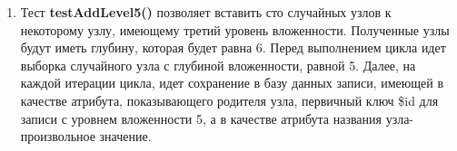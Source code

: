 \documentclass[a4paper,14pt]{extreport}
\theoremstyle{definition}
\begin{document}
\begin{enumerate}
\begin{table}[H]
\end{table}
\item Тест \textbf{testAddLevel5()} позволяет вставить сто случайных узлов к некоторому узлу, имеющему третий уровень вложенности. Полученные узлы будут иметь глубину, которая будет равна 6. Перед выполнением цикла идет выборка случайного узла с глубиной вложенности, равной 5. Далее, на каждой итерации цикла, идет сохранение в базу данных записи, имеющей в качестве атрибута, показывающего родителя узла, первичный ключ \$id для записи с уровнем вложенности 5, а в качестве атрибута названия узла-произвольное значение.


\end{enumerate}
\end{document}

